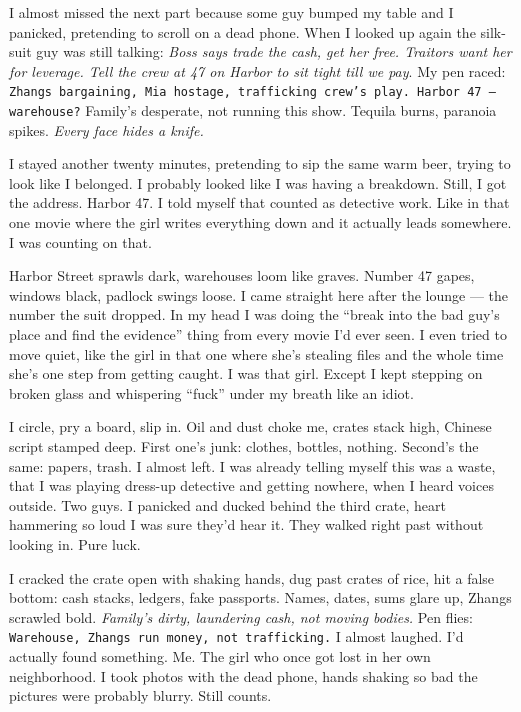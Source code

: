 \documentclass[12pt,oneside]{book}
\newcommand{\note}[1]{\texttt{#1}}
\begin{document}
I almost missed the next part because some guy bumped my table and I panicked, pretending to scroll on a dead phone. When I looked up again the silk-suit guy was still talking: \textit{Boss says trade the cash, get her free. Traitors want her for leverage. Tell the crew at 47 on Harbor to sit tight till we pay}. My pen raced: \note{Zhangs bargaining, Mia hostage, trafficking crew’s play. Harbor 47 — warehouse?} Family’s desperate, not running this show. Tequila burns, paranoia spikes. \textit{Every face hides a knife.} 

I stayed another twenty minutes, pretending to sip the same warm beer, trying to look like I belonged. I probably looked like I was having a breakdown. Still, I got the address. Harbor 47. I told myself that counted as detective work. Like in that one movie where the girl writes everything down and it actually leads somewhere. I was counting on that.

Harbor Street sprawls dark, warehouses loom like graves. Number 47 gapes, windows black, padlock swings loose. I came straight here after the lounge — the number the suit dropped. In my head I was doing the “break into the bad guy’s place and find the evidence” thing from every movie I’d ever seen. I even tried to move quiet, like the girl in that one where she’s stealing files and the whole time she’s one step from getting caught. I was that girl. Except I kept stepping on broken glass and whispering “fuck” under my breath like an idiot.

I circle, pry a board, slip in. Oil and dust choke me, crates stack high, Chinese script stamped deep. First one’s junk: clothes, bottles, nothing. Second’s the same: papers, trash. I almost left. I was already telling myself this was a waste, that I was playing dress-up detective and getting nowhere, when I heard voices outside. Two guys. I panicked and ducked behind the third crate, heart hammering so loud I was sure they’d hear it. They walked right past without looking in. Pure luck.

I cracked the crate open with shaking hands, dug past crates of rice, hit a false bottom: cash stacks, ledgers, fake passports. Names, dates, sums glare up, Zhangs scrawled bold. \textit{Family’s dirty, laundering cash, not moving bodies.} Pen flies: \note{Warehouse, Zhangs run money, not trafficking.} I almost laughed. I’d actually found something. Me. The girl who once got lost in her own neighborhood. I took photos with the dead phone, hands shaking so bad the pictures were probably blurry. Still counts.
\end{document}
